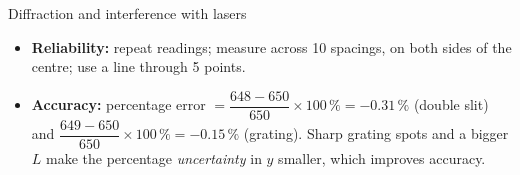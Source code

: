 \begin{experiment}{Diffraction and interference with lasers}
{\begin{itemize}
        source) makes the slits coherent. Use $\Delta y = \dfrac{\lambda L}{d}$ only at small
        angles (here less than \ang{2}); for the grating (\ang{11}) use $\tan^{-1}$, then $\sin$.
  \item \textbf{Reliability:} repeat readings; measure across 10 spacings, on both sides of
        the centre; use a line through 5 points.
  \item \textbf{Accuracy:} percentage error $= \dfrac{648 - 650}{650} \times 100\,\% =
        -0.31\,\%$ (double slit) and $\dfrac{649 - 650}{650} \times 100\,\% = -0.15\,\%$
        (grating). Sharp grating spots and a bigger $L$ make the percentage
        \emph{uncertainty} in $y$ smaller, which improves accuracy.
\end{itemize}}
\end{experiment}

